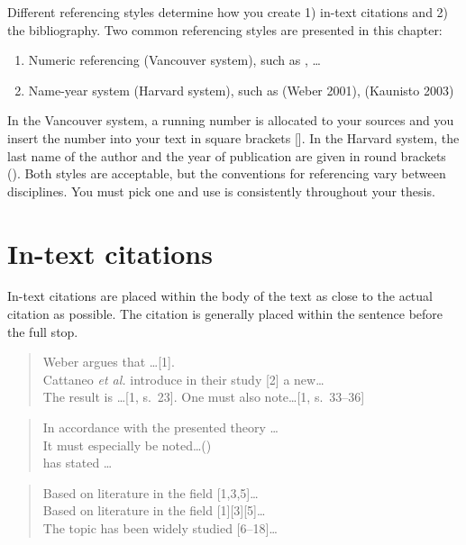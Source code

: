 \documentclass[twoside,draftfooter]{tutthesis} %
\newif\ifnameyear
\begin{document}
Different referencing styles determine how you create 1) in-text citations and 2) the bibliography.
Two common referencing styles are presented in this chapter:
\begin{enumerate}
\ifnameyear
  \item Numeric referencing (Vancouver system), such as [1], [2]\ldots
  \item Name-year system (Harvard system), such as \citep{Weber2001}, \citep{Kaunisto2003}
\else
  \item Numeric referencing (Vancouver system), such as \cite{Weber2001}, \cite{Kaunisto2003}\ldots
  \item Name-year system (Harvard system), such as (Weber 2001), (Kaunisto 2003)
\fi
\end{enumerate}

In the Vancouver system, a running number is allocated to your sources and you insert the number into your text in square brackets [].
In the Harvard system, the last name of the author and the year of publication are given in round brackets ().
Both styles are acceptable, but the conventions for referencing vary between disciplines.
You must pick one and use is consistently throughout your thesis.


\section{In-text citations}

In-text citations are placed within the body of the text as close to the actual citation as possible.
The citation is generally placed within the sentence before the full stop.

\ifnameyear
  \begin{quotation}
  Weber argues that \ldots [1].\\
  Cattaneo \emph{et al.} introduce in their study [2] a new\ldots\\
  The result is \ldots [1, s.~23]. One must also note\ldots [1, s.~33--36]
  \end{quotation}

  \begin{quotation}
  In accordance with the presented theory \ldots \citep{Weber2001}\\
  It must especially be noted\ldots (\citeauthor{Cattaneo2004})\\
  \citet[s.~230]{Weber2001} has stated \ldots
  \end{quotation}
    
  \begin{quotation}
  Based on literature in the field [1,3,5]\ldots\\
  Based on literature in the field [1][3][5]\ldots\\
  The topic has been widely studied [6--18]\ldots
  \end{quotation}
    
\end{document}
